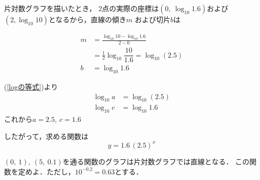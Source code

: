\documentclass{b5-kaku}
\begin{document}
\begin{solution}
\begin{mawarikomi}[10]{60mm}{}
片対数グラフを描いたとき，
2点の実際の座標は$(0,\ \log_{10}1.6)$\vspace{1mm}および
$(2,\log_{10}10)$となるから，直線の傾き$m$
および切片$b$は

\begin{align*}
m&=\frac{\log_{10}10-\log_{10}1.6}{2-0}\\
&=\frac{1}{2}\log_{10}\dfrac{10}{1.6}=\log_{10}(2.5)\\
b&=\log_{10}1.6
\end{align*}

(\ref{logの等式})より
\begin{align*}
\log_{10}a&=\log_{10}(2.5)\\ 
\log_{10}c&=\log_{10}{1.6}
\end{align*}
これから$a=2.5,\ c=1.6$ 

\noindent
したがって，求める関数は
\[
y=1.6\,(2.5)^x\tag*{\qed}
\]
\end{mawarikomi}
\end{solution}

\begin{question}
$(0,\ 1),\ (5,\ 0.1)$を通る関数のグラフは片対数グラフでは直線となる．
この関数を定めよ．ただし，$10^{-0.2}=0.63$とする．
\end{question}
\end{document}
